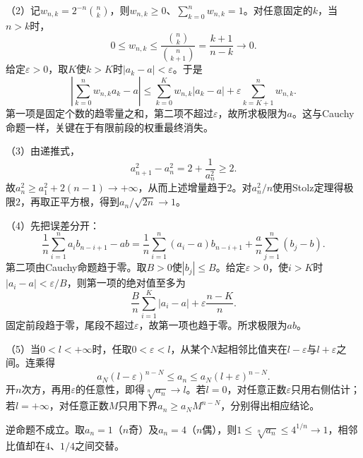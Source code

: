 （2）记\(w_{n,k}=2^{-n}\binom nk\)，则\(w_{n,k}\ge0\)、\(\sum_{k=0}^nw_{n,k}=1\)。对任意固定的\(k\)，当\(n>k\)时，
\[
0\le w_{n,k}\le\frac{\binom nk}{\binom n{k+1}}=\frac{k+1}{n-k}\to0.
\]
给定\(\varepsilon>0\)，取\(K\)使\(k>K\)时\(|a_k-a|<\varepsilon\)。于是
\[
\left|\sum_{k=0}^nw_{n,k}a_k-a\right|
\le\sum_{k=0}^Kw_{n,k}|a_k-a|+\varepsilon\sum_{k=K+1}^nw_{n,k}.
\]
第一项是固定个数的趋零量之和，第二项不超过\(\varepsilon\)，故所求极限为\(a\)。这与Cauchy命题一样，关键在于有限前段的权重最终消失。

（3）由递推式，
\[
a_{n+1}^2-a_n^2=2+\frac1{a_n^2}\ge2.
\]
故\(a_n^2\ge a_1^2+2(n-1)\to+\infty\)，从而上述增量趋于\(2\)。对\(a_n^2/n\)使用Stolz定理得极限\(2\)，再取正平方根，得到\(a_n/\sqrt{2n}\to1\)。

（4）先把误差分开：
\[
\frac1n\sum_{i=1}^na_ib_{n-i+1}-ab
=\frac1n\sum_{i=1}^n(a_i-a)b_{n-i+1}+\frac an\sum_{j=1}^n(b_j-b).
\]
第二项由Cauchy命题趋于零。取\(B>0\)使\(|b_j|\le B\)。给定\(\varepsilon>0\)，使\(i>K\)时\(|a_i-a|<\varepsilon/B\)，则第一项的绝对值至多为
\[
\frac Bn\sum_{i=1}^K|a_i-a|+\varepsilon\frac{n-K}{n}.
\]
固定前段趋于零，尾段不超过\(\varepsilon\)，故第一项也趋于零。所求极限为\(ab\)。

（5）当\(0<l<+\infty\)时，任取\(0<\varepsilon<l\)，从某个\(N\)起相邻比值夹在\(l-\varepsilon\)与\(l+\varepsilon\)之间。连乘得
\[
a_N(l-\varepsilon)^{n-N}\le a_n\le a_N(l+\varepsilon)^{n-N}.
\]
开\(n\)次方，再用\(\varepsilon\)的任意性，即得\(\sqrt[n]{a_n}\to l\)。若\(l=0\)，对任意正数\(\varepsilon\)只用右侧估计；若\(l=+\infty\)，对任意正数\(M\)只用下界\(a_n\ge a_NM^{n-N}\)，分别得出相应结论。

逆命题不成立。取\(a_n=1\)（\(n\)奇）及\(a_n=4\)（\(n\)偶），则\(1\le\sqrt[n]{a_n}\le4^{1/n}\to1\)，相邻比值却在\(4\)、\(1/4\)之间交替。
\par
